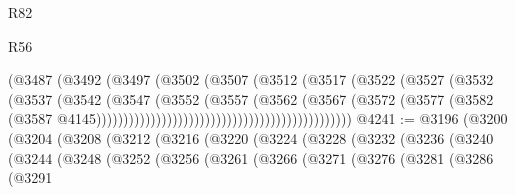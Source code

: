 \begin{lexlean}{R82}
\begin{lexlean}{R56}
\begin{coremodule}
{{{{{{{{{{{{{{{{{{{{{{{{{{{{{{{{{{{{{{{{{{{{{{{{{{{{{{{{{{{{{{{{{{{{{{{{{{{{{{{{{{{{{{{{{{{{{{{{{{{{{{{{{{{{{{{{{{{{{{{{{{{{{{{{{{{{{{{{{{{{{{{{{{{{{{{{{{{{{{{{{{{{{{{{{{{{{{{{{{{{{{{{{{{{{{{{{{{{{{{{{{{{{{{{{{{                                                        (@3487
                                                          (@3492
                                                            (@3497
                                                              (@3502
                                                                (@3507
                                                                  (@3512
                                                                    (@3517
                                                                      (@3522
                                                                        (@3527
                                                                          (@3532
                                                                            (@3537
                                                                              (@3542
                                                                                (@3547
                                                                                  (@3552
                                                                                    (@3557
                                                                                      (@3562
                                                                                        (@3567
                                                                                          (@3572
                                                                                            (@3577
                                                                                              (@3582
                                                                                                (@3587
                                                                                                  @4145)))))))))))))))))))))))))))))))))))))))))))))))
@4241 := @3196
    (@3200
      (@3204
        (@3208
          (@3212
            (@3216
              (@3220
                (@3224
                  (@3228
                    (@3232
                      (@3236
                        (@3240
                          (@3244
                            (@3248
                              (@3252
                                (@3256
                                  (@3261
                                    (@3266
                                      (@3271
                                        (@3276
                                          (@3281
                                            (@3286
                                              (@3291
}}}}}}}}}}}}}}}}}}}}}}}}}}}}}}}}}}}}}}}}}}}}}}}}}}}}}}}}}}}}}}}}}}}}}}}}}}}}}}}}}}}}}}}}}}}}}}}}}}}}}}}}}}}}}}}}}}}}}}}}}}}}}}}}}}}}}}}}}}}}}}}}}}}}}}}}}}}}}}}}}}}}}}}}}}}}}}}}}}}}}}}}}}}}}}}}}}}}}}}}}}}}}}}}}}}
\end{coremodule}
\end{lexlean}
\end{lexlean}
